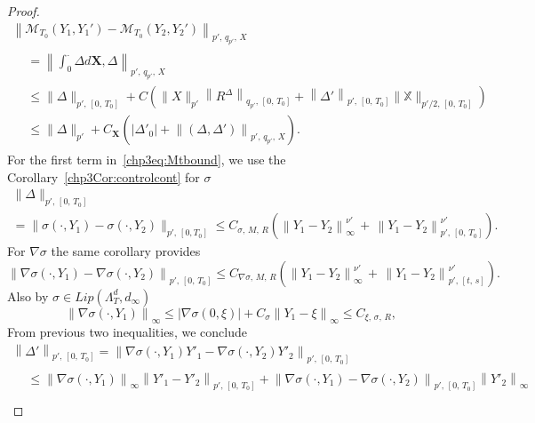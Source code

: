 \documentclass[AHL,Unicode,longabstracts,published]{cedram}
\newcommand{\bfX}{\mathbf{X}}
\newcommand{\bbX}{\mathbb{X}}
\newcommand{\calM}{\mathcal{M}}
\begin{document}
\begin{proof}
\begin{multline}\label{chp3eq:Mtbound}
\left\|\calM_{T_0}\left(Y_1,Y_1'\right)-\calM_{T_0}\left(Y_2,Y_2'\right)\right\|_{p',\, q_{p'},\,X}\\
\begin{aligned}
&=\left\|\int_0^{\cdot}\Delta d\bfX, \Delta\right\|_{p',\,q_{p'},\,X}\\
&\leq\|\Delta\|_{p',\,\left[0,\,T_0\right]}+C\left(\|X\|_{p'}\left\|R^{\Delta}\right\|_{q_{p'},\,\left[0,\,T_0\right]}+\left\|\Delta'\right\|_{p',\,\left[0,\,T_0\right]}\|\bbX\|_{p'/2,\,\left[0,\,T_0\right]}\right)\\
&\leq\|\Delta\|_{p'}+C_{\bfX}\left(\left|\Delta'_0\right|+\left\|\left(\Delta,\Delta'\right)\right\|_{p',\,q_{p'},\, X}\right).
\end{aligned}
\end{multline}
For the first term in~\eqref{chp3eq:Mtbound}, we use the Corollary~\ref{chp3Cor:controlcont} for $\sigma$
\begin{multline}\label{chp3eq:Deltanubound}
\|\Delta\|_{p',\,\left[0,\,T_0\right]}\\
=\|{\sigma}\left(\cdot, Y_1\right)-{\sigma}\left(\cdot, Y_2\right)\|_{p',\,\left[0,T_0\right]}
\leq C_{\sigma,\,M,\,R} \left(\left\|Y_1-Y_2\right\|_{\infty}^{\nu'}\,+\,\left\|Y_1-Y_2\right\|_{p',\,\left[0,\,T_0\right]}^{\nu'}\right).
\end{multline}
For $\nabla\sigma$ the same corollary provides
\[
\left\|\nabla{\sigma}\left(\cdot, Y_1\right)-\nabla{\sigma}\left(\cdot, Y_2\right)\right\|_{p',\,\left[0,\,T_0\right]}
\leq C_{\nabla \sigma,\,M,\,R}\left(\left\|Y_1-Y_2\right\|_{\infty}^{\nu'}\,+\,\left\|Y_1-Y_2\right\|_{p',\,[t,\,s]}^{\nu'}\right).
\]
Also by $\sigma\in Lip(\Lambda_T^d, d_{\infty})$
\[
\left\|\nabla\sigma(\cdot, Y_1)\right\|_{\infty} \leq \left|\nabla \sigma(0, \xi)\right| +C_{\sigma}\left\|Y_1-\xi\right\|_{\infty}\le C_{\xi,\,\sigma,\,R},
\]
From previous two inequalities, we conclude
\begin{multline}\label{eq:Deltanu'}
\left\|\Delta'\right\|_{p',\,\left[0,\,T_0\right]}=\left\|\nabla {\sigma}\left(\cdot, Y_1\right)Y'_1-\nabla {\sigma}\left(\cdot, Y_2\right)Y'_2\right\|_{p',\, \left[0,\,T_0\right]}\\
\begin{aligned}
&\leq\left\|\nabla\sigma(\cdot, Y_1)\right\|_{\infty}\left\|Y'_1-Y'_2\right\|_{p',\,\left[0,\,T_0\right]} +\left\|\nabla {\sigma}\left(\cdot, Y_1\right)-\nabla {\sigma}\left(\cdot, Y_2\right)\right\|_{p',\,\left[0,\,T_0\right]}\left\|Y'_2\right\|_{\infty}\\

\end{aligned}
\end{multline}
\end{proof}
\end{document}
